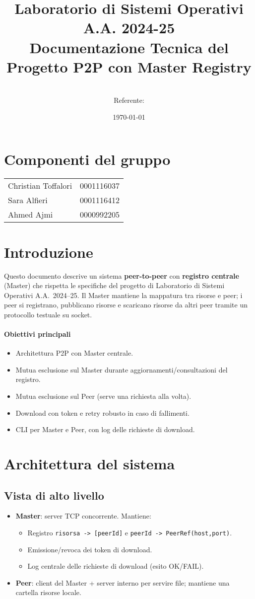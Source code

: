 \documentclass[a4paper,12pt]{article}
\title{\textbf{Laboratorio di Sistemi Operativi A.A. 2024-25}\\[4pt]
Documentazione Tecnica del Progetto P2P con Master Registry}
\author{\GroupName\\ \small Referente: \texttt{\ReferenteEmail}}
\date{\today}
\makeatletter
\newcommand{\Members}{%
  \begin{tabular}{@{}ll@{}}
  Christian Toffalori & 0001116037 \\
  Sara Alfieri         & 0001116412 \\
  Ahmed Ajmi         & 0000992205 \\
  \end{tabular}
}
\makeatother
\begin{document}
\maketitle

\section*{Componenti del gruppo}
\Members

\tableofcontents
\newpage

\section{Introduzione}
Questo documento descrive un sistema \textbf{peer-to-peer} con \textbf{registro centrale} (Master) che rispetta le specifiche del progetto di Laboratorio di Sistemi Operativi A.A.\ 2024--25. Il Master mantiene la mappatura tra risorse e peer; i peer si registrano, pubblicano risorse e scaricano risorse da altri peer tramite un protocollo testuale su socket.

\paragraph{Obiettivi principali}
\begin{itemize}[nosep]
  \item Architettura P2P con Master centrale.
  \item Mutua esclusione sul Master durante aggiornamenti/consultazioni del registro.
  \item Mutua esclusione sul Peer (serve una richiesta alla volta).
  \item Download con token e retry robusto in caso di fallimenti.
  \item CLI per Master e Peer, con log delle richieste di download.
\end{itemize}

\section{Architettura del sistema}
\subsection{Vista di alto livello}
\begin{itemize}[nosep]
  \item \textbf{Master}: server TCP concorrente. Mantiene:
  \begin{itemize}[nosep]
    \item Registro \texttt{risorsa -> [peerId]} e \texttt{peerId -> PeerRef(host,port)}.
    \item Emissione/revoca dei token di download.
    \item Log centrale delle richieste di download (esito OK/FAIL).
  \end{itemize}
  \item \textbf{Peer}: client del Master + server interno per servire file; mantiene una cartella risorse locale. 
\end{itemize}
\end{document}
